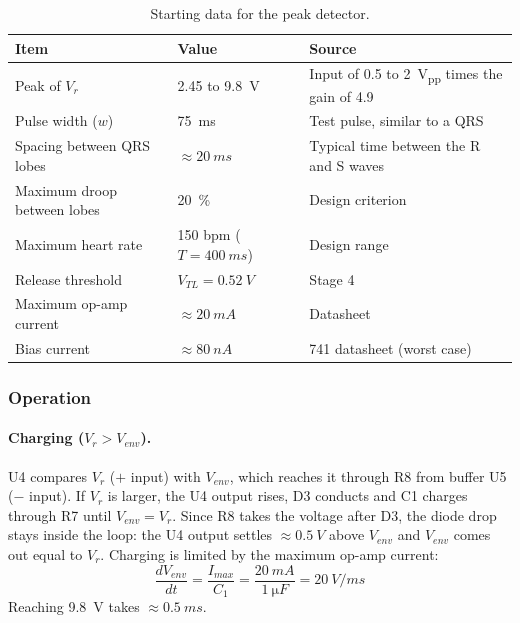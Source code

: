 \documentclass[11pt,letterpaper]{article}
\newcommand{\Vr}{V_r}
\newcommand{\Venv}{V_{env}}
\newcommand{\VTL}{V_{TL}}
\begin{document}
\begin{table}[H]
\centering
\caption{Starting data for the peak detector.}\label{tab:datos3}
\begin{tabularx}{\linewidth}{@{}llX@{}}
\toprule
Item & Value & Source \\
\midrule
Peak of $\Vr$ & 2.45 to \SI{9.8}{V} & Input of 0.5 to \SI{2}{V_{pp}} times the gain of 4.9 \\
Pulse width ($w$) & \SI{75}{ms} & Test pulse, similar to a QRS \\
Spacing between QRS lobes & $\approx\SI{20}{ms}$ & Typical time between the R and S waves \\
Maximum droop between lobes & \SI{20}{\percent} & Design criterion \\
Maximum heart rate & 150 bpm ($T=\SI{400}{ms}$) & Design range \\
Release threshold & $\VTL=\SI{0.52}{V}$ & Stage 4 \\
Maximum op-amp current & $\approx\SI{20}{mA}$ & Datasheet \\
Bias current & $\approx\SI{80}{nA}$ & 741 datasheet (worst case) \\
\bottomrule
\end{tabularx}
\end{table}

\subsubsection{Operation}

\paragraph{Charging ($\Vr>\Venv$).} U4 compares $\Vr$ ($+$ input) with $\Venv$, which reaches it through R8 from buffer U5 ($-$ input). If $\Vr$ is larger, the U4 output rises, D3 conducts and C1 charges through R7 until $\Venv=\Vr$. Since R8 takes the voltage after D3, the diode drop stays inside the loop: the U4 output settles $\approx\SI{0.5}{V}$ above $\Venv$ and $\Venv$ comes out equal to $\Vr$. Charging is limited by the maximum op-amp current:
\begin{equation}
\frac{d\Venv}{dt}=\frac{I_{max}}{C_1}=\frac{\SI{20}{mA}}{\SI{1}{\micro F}}=\SI{20}{V/ms}
\end{equation}
Reaching \SI{9.8}{V} takes $\approx\SI{0.5}{ms}$.
\end{document}
